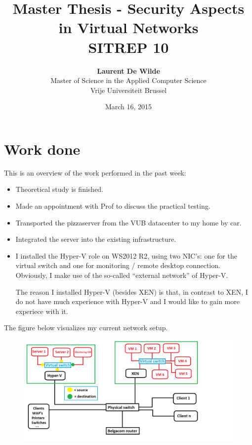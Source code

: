 \documentclass[11pt, a4paper]{article}
\title{Master Thesis -  Security Aspects in Virtual Networks\\ \textbf{SITREP 10}}
\author{\textbf{Laurent De Wilde} \\ Master of Science in the Applied Computer Science \\ Vrije Universiteit Brussel}
\date{March 16, 2015}
\begin{document}
\maketitle

\section*{Work done}

This is an overview of the work performed in the past week:
\begin{itemize}
\item Theoretical study is finished.
\item Made an appointment with Prof to discuss the practical testing.
\item Transported the pizzaserver from the VUB datacenter to my home by car.
\item Integrated the server into the existing infrastructure.
\item I installed the Hyper-V role on WS2012 R2, using two NIC's: one for the virtual switch and one for monitoring / remote desktop connection. Obviously, I make use of the so-called ``external network'' of Hyper-V. 

The reason I installed Hyper-V (besides XEN) is that, in contrast to XEN, I do not have much experience with Hyper-V and I would like to gain more experiece with it.
\end{itemize}
The figure below visualizes my current network setup.
\begin{figure}[h]
    \centering
    \includegraphics[width=1.05\textwidth]{Network.png}
\end{figure}

\clearpage
\end{document}
